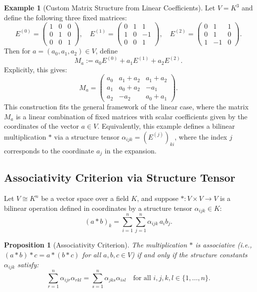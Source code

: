 \documentclass[12pt]{article}
\theoremstyle{definition}
\newtheorem{example}{Example}[section]
\theoremstyle{plain}
\newtheorem{proposition}[definition]{Proposition}
\theoremstyle{remark}
\begin{document}
\begin{example}[Custom Matrix Structure from Linear Coefficients]
Let \( V = K^3 \) and define the following three fixed matrices:
\[
E^{(0)} =
\begin{pmatrix}
1 & 0 & 0 \\
0 & 1 & 0 \\
0 & 0 & 1
\end{pmatrix}, \quad
E^{(1)} =
\begin{pmatrix}
0 & 1 & 1 \\
1 & 0 & -1 \\
0 & 0 & 1
\end{pmatrix}, \quad
E^{(2)} =
\begin{pmatrix}
0 & 1 & 1 \\
0 & 1 & 0 \\
1 & -1 & 0
\end{pmatrix}.
\]
Then for \( a = (a_0, a_1, a_2) \in V \), define
\[
M_a := a_0 E^{(0)} + a_1 E^{(1)} + a_2 E^{(2)}.
\]
Explicitly, this gives:
\[
M_a =
\begin{pmatrix}
a_0 & a_1 + a_2 & a_1 + a_2 \\
a_1 & a_0 + a_2 & -a_1 \\
a_2 & -a_2 & a_0 + a_1
\end{pmatrix}.
\]
This construction fits the general framework of the linear case, where the matrix \( M_a \) is a linear combination of fixed matrices with scalar coefficients given by the coordinates of the vector \( a \in V \). Equivalently, this example defines a bilinear multiplication \( * \) via a structure tensor \( \alpha_{ijk} = (E^{(j)})_{ki} \), where the index \( j \) corresponds to the coordinate \( a_j \) in the expansion.
\end{example}

\subsection{Associativity Criterion via Structure Tensor}

Let \( V \cong K^n \) be a vector space over a field \( K \), and suppose \( * : V \times V \to V \) is a bilinear operation defined in coordinates by a structure tensor \( \alpha_{ijk} \in K \):
\[
(a * b)_k = \sum_{i=1}^n \sum_{j=1}^n \alpha_{ijk} \, a_i b_j.
\]

\begin{proposition}[Associativity Criterion]
The multiplication \( * \) is associative (i.e., \( (a * b) * c = a * (b * c) \) for all \( a, b, c \in V \)) if and only if the structure constants \( \alpha_{ijk} \) satisfy:
\[
\sum_{r=1}^n \alpha_{ijr} \alpha_{rkl} = \sum_{s=1}^n \alpha_{jks} \alpha_{isl}
\quad \text{for all } i, j, k, l \in \{1, \dots, n\}.
\]
\end{proposition}
\end{document}
